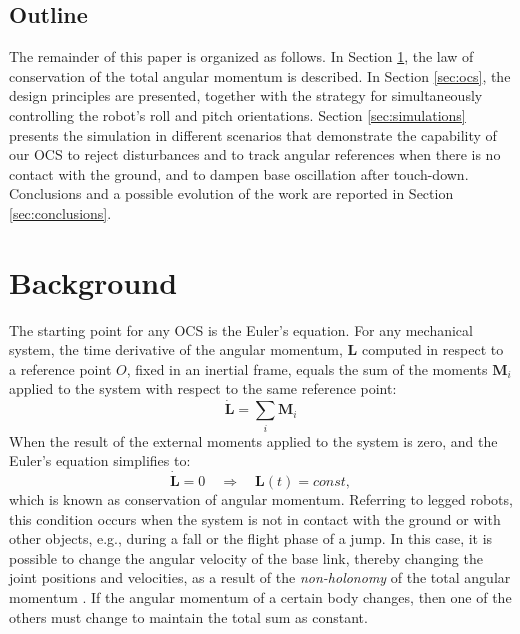 \documentclass[sensors,article,accept,pdftex,moreauthors]{Definitions/mdpi}
\begin{document}
\subsection{Outline}
The remainder of this paper is organized as follows. In Section \ref{sec:background}, the law of conservation of the total angular momentum is described. In Section \ref{sec:ocs}, the design principles are presented, together with the strategy for simultaneously controlling the robot's roll and pitch orientations. Section \ref{sec:simulations} presents the simulation in different scenarios that demonstrate the capability of our OCS to reject disturbances and to track angular references when there is no contact with the ground, and to dampen base oscillation after touch-down. Conclusions and a possible evolution of the work are reported in Section \ref{sec:conclusions}.


\section{Background}
\label{sec:background}
The starting point for any OCS is the Euler's equation. For any mechanical system, the time derivative of the angular momentum, %
 $\bm{L}$ computed in respect to a reference point $O$, fixed in an inertial frame, equals the sum of the moments $\bm{M}_i$ applied to the system with respect to the same reference point:
\begin{equation}
\dot{\bm{L}} = \sum_i \bm{M}_i
\end{equation}
When %
 the result of the external moments applied to the system is zero, and the Euler's equation simplifies to:
 \begin{equation}
\dot{\bm{L}} = 0 \quad \Rightarrow \quad \bm{L}(t) = const,
\label{eq:cons_ang_mom}
\end{equation}
which is known as conservation of angular momentum.
Referring to legged robots, this condition occurs when the system is not in contact with the ground or with other objects, e.g., during a fall or the flight phase of a jump.
In this case, it is possible to change the angular velocity of the base link, thereby changing the joint positions and velocities, as a result of the \textit{non-holonomy} of the total angular momentum \cite{wieber2016modeling}. If the angular momentum of a certain body changes, then one of the others must change to maintain the total sum as constant.
\end{document}
